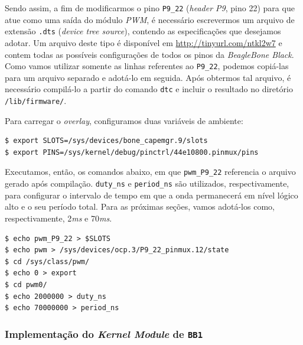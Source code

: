 Sendo assim, a fim de modificarmos o pino \texttt{P9\_22} (\textit{header P9},
pino 22) para que atue como uma saída do módulo \textit{PWM}, é necessário
escrevermos um arquivo de extensão \texttt{.dts} (\textit{device tree source}), contendo as especificações que
desejamos adotar. Um arquivo deste tipo é disponível em
\url{http://tinyurl.com/ntkl2w7} e contem todas as possíveis configurações de
todos os pinos da \textit{BeagleBone Black}. Como vamos utilizar somente as
linhas referentes ao \texttt{P9\_22}, podemos copiá-las para um arquivo
separado e adotá-lo em seguida. Após obtermos tal arquivo, é necessário
compilá-lo a partir do comando \texttt{dtc} e incluir o resultado no diretório
\texttt{/lib/firmware/}. 

\vspace{12pt}

Para carregar o \textit{overlay}, configuramos duas variáveis de ambiente:

\begin{lstlisting}[keywordstyle=\ttfamily, style=nonumbers]
$ export SLOTS=/sys/devices/bone_capemgr.9/slots
$ export PINS=/sys/kernel/debug/pinctrl/44e10800.pinmux/pins
\end{lstlisting}

\vspace{12pt}

Executamos, então, os comandos abaixo, em que \texttt{pwm\_P9\_22} referencia o
arquivo gerado após compilação. \texttt{duty\_ns} e \texttt{period\_ns}
são utilizados, respectivamente, para configurar o intervalo de tempo em que a
onda permanecerá em nível lógico alto e o seu período total. Para as próximas
seções, vamos adotá-los como, respectivamente, 2\textit{ms} e 70\textit{ms}.

\begin{lstlisting}[keywordstyle=\ttfamily, style=nonumbers]
$ echo pwm_P9_22 > $SLOTS
$ echo pwm > /sys/devices/ocp.3/P9_22_pinmux.12/state
$ cd /sys/class/pwm/
$ echo 0 > export 
$ cd pwm0/
$ echo 2000000 > duty_ns
$ echo 70000000 > period_ns
\end{lstlisting}

\subsubsection{Implementação do \textit{Kernel Module} de \texttt{BB1}}
\label{sec:bb1}

